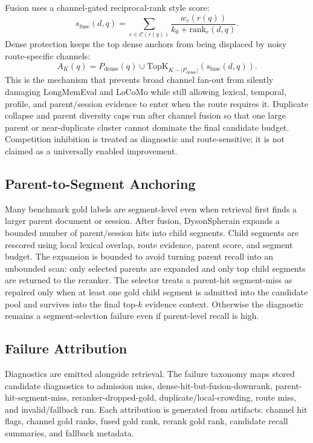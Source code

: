 \documentclass[10pt]{article}
\newcommand{\system}{DysonSpherain}
\begin{document}
Fusion uses a channel-gated reciprocal-rank style score:
\[
s_{\mathrm{fuse}}(d,q)=\sum_{c\in\mathcal{C}(r(q))}
\frac{w_c(r(q))}{k_0+\mathrm{rank}_c(d,q)}.
\]
Dense protection keeps the top dense anchors from being displaced by noisy
route-specific channels:
\[
A_K(q)=P_{\mathrm{dense}}(q)\cup
\mathrm{TopK}_{K-|P_{\mathrm{dense}}|}
\left(s_{\mathrm{fuse}}(d,q)\right).
\]
This is the mechanism that prevents broad channel fan-out from silently
damaging LongMemEval and LoCoMo while still allowing lexical, temporal,
profile, and parent/session evidence to enter when the route requires it.
Duplicate collapse and parent diversity caps run after channel fusion so that
one large parent or near-duplicate cluster cannot dominate the final candidate
budget. Competition inhibition is treated as diagnostic and route-sensitive;
it is not claimed as a universally enabled improvement.

\subsection{Parent-to-Segment Anchoring}

Many benchmark gold labels are segment-level even when retrieval first finds a
larger parent document or session. After fusion, \system{} expands a bounded
number of parent/session hits into child segments. Child segments are rescored
using local lexical overlap, route evidence, parent score, and segment budget.
The expansion is bounded to avoid turning parent recall into an unbounded scan:
only selected parents are expanded and only top child segments are returned to
the reranker.
The selector treats a parent-hit segment-miss as repaired only when at least
one gold child segment is admitted into the candidate pool and survives into
the final top-$k$ evidence context. Otherwise the diagnostic remains a
segment-selection failure even if parent-level recall is high.

\subsection{Failure Attribution}

Diagnostics are emitted alongside retrieval. The failure taxonomy maps stored
candidate diagnostics to admission miss, dense-hit-but-fusion-downrank,
parent-hit-segment-miss, reranker-dropped-gold, duplicate/local-crowding, route
miss, and invalid/fallback run. Each attribution is generated from artifacts:
channel hit flags, channel gold ranks, fused gold rank, rerank gold rank,
candidate recall summaries, and fallback metadata.
\end{document}
